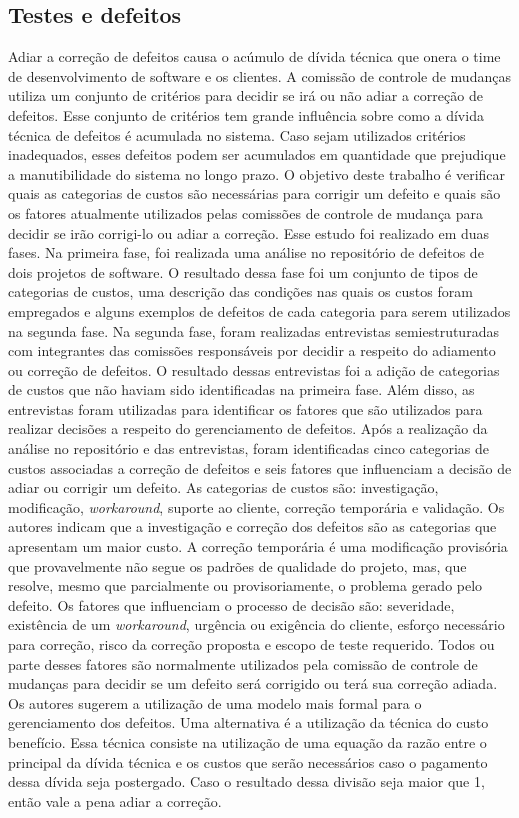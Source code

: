 \subsection{Testes e defeitos}

Adiar a correção de defeitos causa o acúmulo de dívida técnica que onera o time de desenvolvimento de software e os clientes. A comissão de controle de mudanças utiliza um conjunto de critérios para decidir se irá ou não adiar a correção de defeitos. Esse conjunto de critérios tem grande influência sobre como a dívida técnica de defeitos é acumulada no sistema. Caso sejam utilizados critérios inadequados, esses defeitos podem ser acumulados em quantidade que prejudique a manutibilidade do sistema no longo prazo.  O objetivo deste trabalho \cite{snipes2012defining} é verificar quais as categorias de custos são necessárias para corrigir um defeito e quais são os fatores atualmente utilizados pelas comissões de controle de mudança para decidir se irão corrigi-lo ou adiar a correção. Esse estudo foi realizado em duas fases. Na primeira fase, foi realizada uma análise no repositório de defeitos de dois projetos de software. O resultado dessa fase foi um conjunto de tipos de categorias de custos, uma descrição das condições nas quais os custos foram empregados e alguns exemplos de defeitos de cada categoria para serem utilizados na segunda fase. Na segunda fase, foram realizadas entrevistas semiestruturadas com integrantes das comissões responsáveis por decidir a respeito do adiamento ou correção de defeitos. O resultado dessas entrevistas foi a adição de categorias de custos que não haviam sido identificadas na primeira fase. Além disso, as entrevistas foram utilizadas para identificar os fatores que são utilizados para realizar decisões a respeito do gerenciamento de defeitos. Após a realização da análise no repositório e das entrevistas, foram identificadas cinco categorias de custos associadas a correção de defeitos e seis fatores que influenciam a decisão de adiar ou corrigir um defeito. As categorias de custos são: investigação,  modificação, \textit{workaround}, suporte ao cliente, correção temporária e validação. Os autores indicam que a investigação e correção dos defeitos são as categorias que apresentam um maior custo. A correção temporária é uma modificação provisória que provavelmente não segue os padrões de qualidade do projeto, mas, que resolve, mesmo que parcialmente ou provisoriamente, o problema gerado pelo defeito. Os fatores que influenciam o processo de decisão são: severidade, existência de um \textit{workaround}, urgência ou exigência do cliente, esforço necessário para correção, risco da correção proposta e escopo de teste requerido.  Todos ou parte desses fatores são normalmente utilizados pela comissão de controle de mudanças para decidir se um defeito será corrigido ou terá sua correção adiada. Os autores sugerem a utilização de uma modelo mais formal para o gerenciamento dos defeitos. Uma alternativa é a utilização da técnica do custo benefício. Essa técnica consiste na utilização de uma equação da razão entre o principal da dívida técnica e os custos que serão necessários caso o pagamento dessa dívida seja postergado. Caso o resultado dessa divisão seja maior que 1, então vale a pena adiar a correção. 
